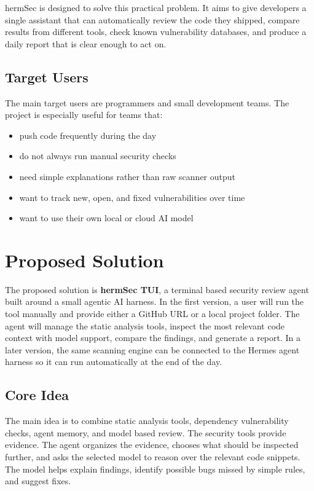 \documentclass[
    numbers=noenddot,
    parskip=half-,
    fontsize=11pt,
    paper=a4,
    oneside,
    titlepage,
    bibliography=totoc,
    chapterprefix=false
]{scrbook}
\begin{document}
hermSec is designed to solve this practical problem. It aims to give developers a single assistant that can automatically review the code they shipped, compare results from different tools, check known vulnerability databases, and produce a daily report that is clear enough to act on.

\section{Target Users}

The main target users are programmers and small development teams. The project is especially useful for teams that:

\begin{itemize}
    \item push code frequently during the day
    \item do not always run manual security checks
    \item need simple explanations rather than raw scanner output
    \item want to track new, open, and fixed vulnerabilities over time
    \item want to use their own local or cloud AI model
\end{itemize}

\chapter{Proposed Solution}

The proposed solution is \textbf{hermSec TUI}, a terminal based security review agent built around a small agentic AI harness. In the first version, a user will run the tool manually and provide either a GitHub URL or a local project folder. The agent will manage the static analysis tools, inspect the most relevant code context with model support, compare the findings, and generate a report. In a later version, the same scanning engine can be connected to the Hermes agent harness so it can run automatically at the end of the day.

\section{Core Idea}

The main idea is to combine static analysis tools, dependency vulnerability checks, agent memory, and model based review. The security tools provide evidence. The agent organizes the evidence, chooses what should be inspected further, and asks the selected model to reason over the relevant code snippets. The model helps explain findings, identify possible bugs missed by simple rules, and suggest fixes.
\end{document}
